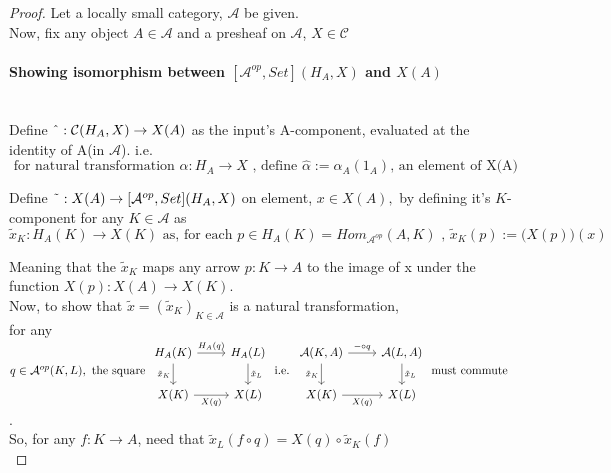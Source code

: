 \documentclass[18pt,a4paper]{article}
\theoremstyle{definition}
\begin{document}
\begin{proof}Let a locally small category,  $\mathcal{A} $ be given. \\
	Now, fix any object $A \in \mathcal{A} $ and a presheaf on $\mathcal{A}$,
	$X \in \mathcal{C}$

	\paragraph{Showing isomorphism between $[\mathcal{A}^{op},Set](H_A,X)$ and $X(A)$}\mbox{} \\

	Define $\string ^ :\mathcal{C}(H_A,X) \to X(A) $
	as the input's A-component, evaluated at the identity of A(in $\mathcal{A}$). i.e.\\
	\[  \text{ for natural transformation } \alpha:H_A \to X\text{ , define  }
	\hat{\alpha}:= \alpha_A(1_A) \text{, an element of X(A) } \]

	Define $\string ~ : X(A) \to [\mathcal{A}^{op}, Set](H_A,X)$ on element, $ x \in X(A), $
	by defining it's $K$-component for any $K \in \mathcal{A} $ as
	\[\tilde{x}_K : H_A(K) \to X(K)
		\text{ as, for each } p\in H_A(K)=\textit{Hom}_{\mathcal{A}^{op}}(A,K) \text{ , }
	\tilde{x}_K (p):=\Big(X(p)\Big)(x) \]

	Meaning that the $\tilde{x}_K$  maps any arrow $p:K \to A$
	to the image of x under the function $X(p):X(A)\to X(K)$.\\

	Now, to show that $\tilde{x}=(\tilde{x}_K)_{K\in \mathcal{A}} $ is a natural transformation,\\

	for any $q \in \mathcal{A}^{op}(K,L), \text{ the square }
	\begin{tikzcd}
		H_A(K) \arrow[swap]{d}{\tilde{x}_K} \arrow{r}{H_A(q)}
		& H_A(L) \arrow{d}{\tilde{x}_L}\\
	X(K) \arrow[swap]{r}{X(q)}
		& X(L)
	\end{tikzcd} \text{ i.e. }
	\begin{tikzcd}
		\mathcal{A}(K,A) \arrow[swap]{d}{\tilde{x}_K} \arrow{r}{ - \circ q}
		& \mathcal{A} (L,A) \arrow{d}{\tilde{x}_L}\\
	X(K) \arrow[swap]{r}{X(q)}
		& X(L)
	\end{tikzcd}\text{ must commute }$.\\

	So, for any $f:K\to A$, need that $\tilde{x}_L(f \circ q)= X(q) \circ \tilde{x}_K(f)$\\


\end{proof}
\end{document}
